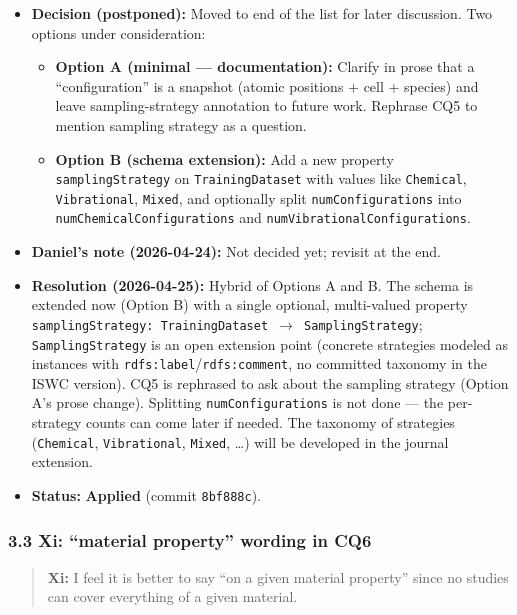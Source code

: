 \begin{itemize}
\tightlist
\item
  \textbf{Decision (postponed):} Moved to end of the list for later discussion. Two options under consideration:

  \begin{itemize}
  \tightlist
  \item
    \textbf{Option A (minimal --- documentation):} Clarify in prose that a ``configuration'' is a snapshot (atomic positions + cell + species) and leave sampling-strategy annotation to future work. Rephrase CQ5 to mention sampling strategy as a question.
  \item
    \textbf{Option B (schema extension):} Add a new property \texttt{samplingStrategy} on \texttt{TrainingDataset} with values like \texttt{Chemical}, \texttt{Vibrational}, \texttt{Mixed}, and optionally split \texttt{numConfigurations} into \texttt{numChemicalConfigurations} and \texttt{numVibrationalConfigurations}.
  \end{itemize}
\item
  \textbf{Daniel's note (2026-04-24):} Not decided yet; revisit at the end.
\item
  \textbf{Resolution (2026-04-25):} Hybrid of Options A and B. The schema is extended now (Option B) with a single optional, multi-valued property \texttt{samplingStrategy:\ TrainingDataset\ $\to$\ SamplingStrategy}; \texttt{SamplingStrategy} is an open extension point (concrete strategies modeled as instances with \texttt{rdfs:label}/\texttt{rdfs:comment}, no committed taxonomy in the ISWC version). CQ5 is rephrased to ask about the sampling strategy (Option A's prose change). Splitting \texttt{numConfigurations} is not done --- the per-strategy counts can come later if needed. The taxonomy of strategies (\texttt{Chemical}, \texttt{Vibrational}, \texttt{Mixed}, \ldots) will be developed in the journal extension.
\item
  \textbf{Status:} {\color{green!60!black}\faCheckCircle} \textbf{Applied} (commit \texttt{8bf888c}).
\end{itemize}

\subsubsection{3.3 Xi: ``material property'' wording in CQ6}\label{xi-material-property-wording-in-cq6}

\begin{quote}
\textbf{Xi:} I feel it is better to say ``on a given material property'' since no studies can cover everything of a given material.
\end{quote}

